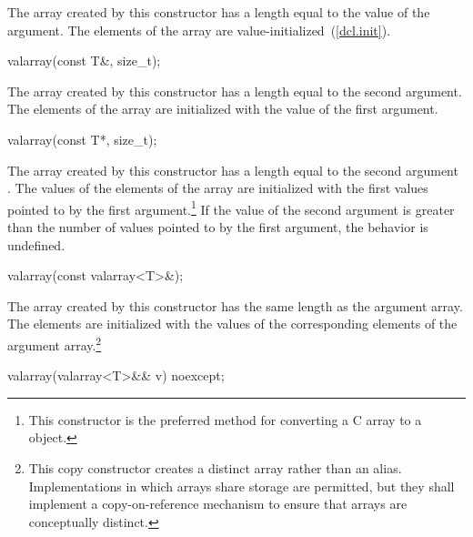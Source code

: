 \begin{itemdescr}
\pnum
The array created by this constructor has a length equal to the value of the argument.
The elements of the array are value-initialized~(\ref{dcl.init}).
\end{itemdescr}

%
\begin{itemdecl}
valarray(const T&, size_t);
\end{itemdecl}

\begin{itemdescr}
\pnum
The array created by this constructor has a length equal to the second
argument.
The elements of the array are initialized with the value of the first argument.
\end{itemdescr}

%
\begin{itemdecl}
valarray(const T*, size_t);
\end{itemdecl}

\begin{itemdescr}
\pnum
The array created by this constructor has a length equal to the second
argument
.
The values of the elements of the array are initialized with the
first
values pointed to by the first argument.\footnote{This constructor is the
preferred method for converting a C array to a
object.}
If the value of the second argument is greater than the number of values
pointed to by the first argument, the behavior is undefined.%
\end{itemdescr}

%
\begin{itemdecl}
valarray(const valarray<T>&);
\end{itemdecl}

\begin{itemdescr}
\pnum
The array created by this constructor has the same length as the argument
array.
The elements are initialized with the values of the corresponding
elements of the argument array.\footnote{This copy constructor creates
a distinct array rather than an alias.
Implementations in which arrays share storage are permitted, but they
shall implement a copy-on-reference mechanism to ensure that arrays are
conceptually distinct.}
\end{itemdescr}

%
\begin{itemdecl}
valarray(valarray<T>&& v) noexcept;
\end{itemdecl}

